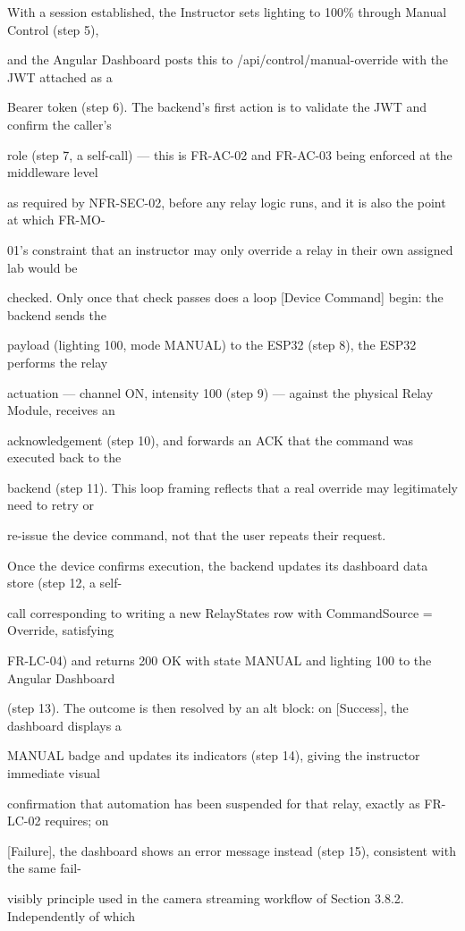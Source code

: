 With a session established, the Instructor sets lighting to 100\% through Manual Control (step 5),

and the Angular Dashboard posts this to /api/control/manual-override with the JWT attached as a

Bearer token (step 6). The backend's first action is to validate the JWT and confirm the caller's

role (step 7, a self-call) --- this is FR-AC-02 and FR-AC-03 being enforced at the middleware level

as required by NFR-SEC-02, before any relay logic runs, and it is also the point at which FR-MO-

01's constraint that an instructor may only override a relay in their own assigned lab would be

checked. Only once that check passes does a loop [Device Command] begin: the backend sends the

payload (lighting 100, mode MANUAL) to the ESP32 (step 8), the ESP32 performs the relay

actuation --- channel ON, intensity 100 (step 9) --- against the physical Relay Module, receives an

acknowledgement (step 10), and forwards an ACK that the command was executed back to the

backend (step 11). This loop framing reflects that a real override may legitimately need to retry or

re-issue the device command, not that the user repeats their request.

Once the device confirms execution, the backend updates its dashboard data store (step 12, a self-

call corresponding to writing a new RelayStates row with CommandSource = Override, satisfying

FR-LC-04) and returns 200 OK with state MANUAL and lighting 100 to the Angular Dashboard

(step 13). The outcome is then resolved by an alt block: on [Success], the dashboard displays a

MANUAL badge and updates its indicators (step 14), giving the instructor immediate visual

confirmation that automation has been suspended for that relay, exactly as FR-LC-02 requires; on

	[Failure], the dashboard shows an error message instead (step 15), consistent with the same fail-

visibly principle used in the camera streaming workflow of Section 3.8.2. Independently of which

